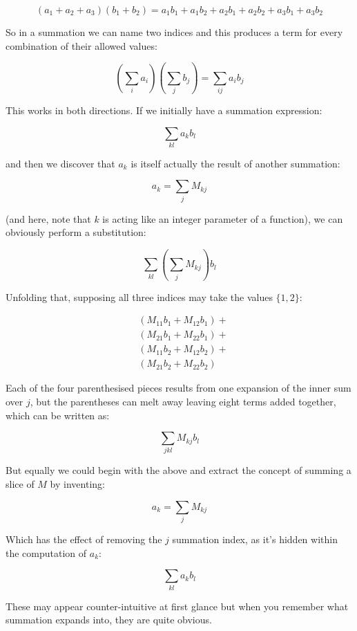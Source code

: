 $$
(a_1 + a_2 + a_3)(b_1 + b_2) = a_1b_1 + a_1b_2 + a_2b_1 + a_2b_2 + a_3b_1 + a_3b_2  
$$

So in a summation we can name two indices and this produces a term for every combination of their allowed values:

$$
\left( \sum_{i} a_i \right) \left( \sum_{j} b_j \right) = \sum_{ij} a_i b_j
$$

This works in both directions. If we initially have a summation expression:

$$
\sum_{kl} a_k b_l 
$$

and then we discover that $a_k$ is itself actually the result of another summation:

$$
a_k = \sum_{j} M_{kj}
$$

(and here, note that $k$ is acting like an integer parameter of a function), we can obviously perform a substitution:

$$
\sum_{kl} \left( \sum_{j} M_{kj} \right) b_l 
$$

Unfolding that, supposing all three indices may take the values $\{1, 2\}$:

\begin{equation}
    \begin{aligned}
        & (M_{11} b_1 + M_{12} b_1) + \\
        & (M_{21} b_1 + M_{22} b_1) + \\
        & (M_{11} b_2 + M_{12} b_2) + \\
        & (M_{21} b_2 + M_{22} b_2)            
    \end{aligned}
\end{equation}

Each of the four parenthesised pieces results from one expansion of the inner sum over $j$, but the parentheses can melt away leaving eight terms added together, which can be written as:

$$
\sum_{jkl} M_{kj} b_l
$$

But equally we could begin with the above and extract the concept of summing a slice of $M$ by inventing:

$$
a_k = \sum_{j} M_{kj}
$$

Which has the effect of removing the $j$ summation index, as it's hidden within the computation of $a_k$:

$$
\sum_{kl} a_k b_l 
$$

These may appear counter-intuitive at first glance but when you remember what summation expands into, they are quite obvious.
